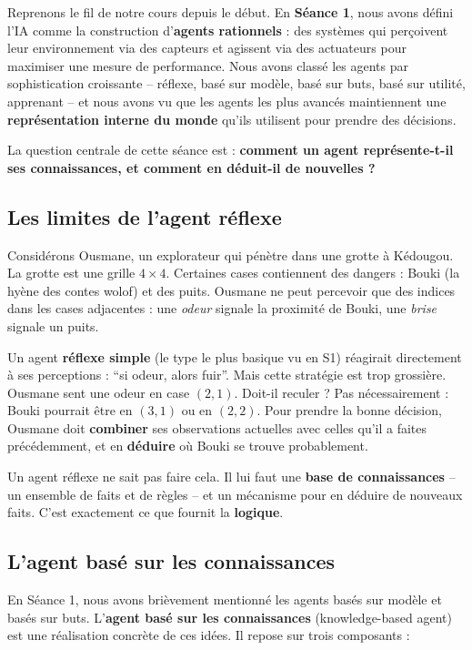\documentclass[11pt,a4paper]{article}
\begin{document}
Reprenons le fil de notre cours depuis le début. En \textbf{Séance 1}, nous avons défini l'IA comme la construction d'\textbf{agents rationnels} : des systèmes qui perçoivent leur environnement via des capteurs et agissent via des actuateurs pour maximiser une mesure de performance. Nous avons classé les agents par sophistication croissante -- réflexe, basé sur modèle, basé sur buts, basé sur utilité, apprenant -- et nous avons vu que les agents les plus avancés maintiennent une \textbf{représentation interne du monde} qu'ils utilisent pour prendre des décisions.

La question centrale de cette séance est : \textbf{comment un agent représente-t-il ses connaissances, et comment en déduit-il de nouvelles ?}

\subsection{Les limites de l'agent réflexe}

Considérons Ousmane, un explorateur qui pénètre dans une grotte à Kédougou. La grotte est une grille $4 \times 4$. Certaines cases contiennent des dangers : Bouki (la hyène des contes wolof) et des puits. Ousmane ne peut percevoir que des indices dans les cases adjacentes : une \textit{odeur} signale la proximité de Bouki, une \textit{brise} signale un puits.

Un agent \textbf{réflexe simple} (le type le plus basique vu en S1) réagirait directement à ses perceptions : ``si odeur, alors fuir''. Mais cette stratégie est trop grossière. Ousmane sent une odeur en case $(2,1)$. Doit-il reculer ? Pas nécessairement : Bouki pourrait être en $(3,1)$ ou en $(2,2)$. Pour prendre la bonne décision, Ousmane doit \textbf{combiner} ses observations actuelles avec celles qu'il a faites précédemment, et en \textbf{déduire} où Bouki se trouve probablement.

Un agent réflexe ne sait pas faire cela. Il lui faut une \textbf{base de connaissances} -- un ensemble de faits et de règles -- et un mécanisme pour en déduire de nouveaux faits. C'est exactement ce que fournit la \textbf{logique}.

\subsection{L'agent basé sur les connaissances}

En Séance 1, nous avons brièvement mentionné les agents basés sur modèle et basés sur buts. L'\textbf{agent basé sur les connaissances} (knowledge-based agent) est une réalisation concrète de ces idées. Il repose sur trois composants :
\end{document}
